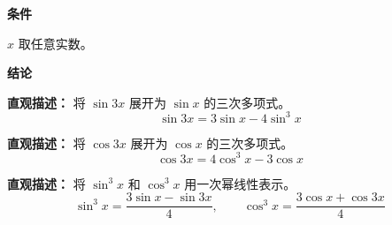 \begin{statementbox}
	\textbf{\textcolor{CStatement}{条件}}
	\begin{description}[style=nextline, leftmargin=2.8em, labelsep=0.5em, itemsep=0.35em]
		\item[\textbf{\textcolor{CStatement}{条件 1（定义域）：}}]
			$x$ 取任意实数。
	\end{description}
	\textbf{\textcolor{CStatement}{结论}}
	\begin{description}[style=nextline, leftmargin=2.8em, labelsep=0.5em, itemsep=0.45em]
		\item[\textbf{\textcolor{CStatement}{结论一（正弦三倍角）：}}]
			\textbf{\textcolor{CStatement}{直观描述：}}
			将 $\sin 3x$ 展开为 $\sin x$ 的三次多项式。
			\[
				\sin 3x = 3\sin x - 4\sin^3 x
			\]
		\item[\textbf{\textcolor{CStatement}{结论二（余弦三倍角）：}}]
			\textbf{\textcolor{CStatement}{直观描述：}}
			将 $\cos 3x$ 展开为 $\cos x$ 的三次多项式。
			\[
				\cos 3x = 4\cos^3 x - 3\cos x
			\]
		\item[\textbf{\textcolor{CStatement}{推广结论（降幂形式）：}}]
			\textbf{\textcolor{CStatement}{直观描述：}}
			将 $\sin^3 x$ 和 $\cos^3 x$ 用一次幂线性表示。
			\[
				\sin^3 x = \frac{3\sin x - \sin 3x}{4},
				\qquad
				\cos^3 x = \frac{3\cos x + \cos 3x}{4}
			\]
	\end{description}

\end{statementbox}
